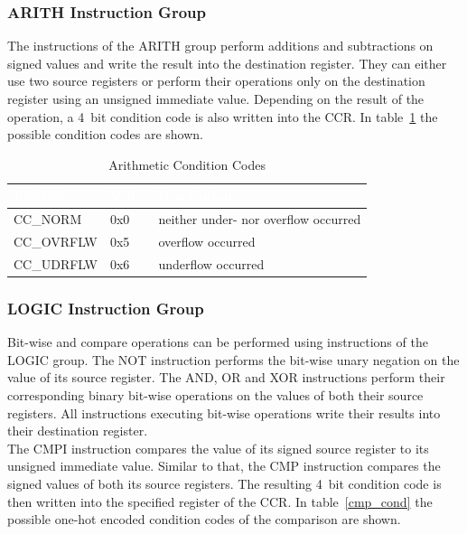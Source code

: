 \subsubsection{ARITH Instruction Group}

The instructions of the ARITH group perform additions and subtractions on signed values and write the result into the destination register.
They can either use two source registers or perform their operations only on the destination register using an unsigned immediate value.
Depending on the result of the operation, a 4~bit condition code is also written into the CCR.
In table~\ref{arith_cond} the possible condition codes are shown.

\begin{table}[htb]
\centering
\begin{tabular}{|l| l| l|}
    \hline
    \rowcolor{black!70}
    \textcolor{white}{\textbf{Identifier}} & \textcolor{white}{\textbf{Value}} & \textcolor{white}{\textbf{Description}} \\
    \hline
    CC\_NORM   & 0x0 & neither under- nor overflow occurred \\
    \hline
    \rowcolor{black!10}
    CC\_OVRFLW & 0x5 & overflow occurred \\
    \hline
    CC\_UDRFLW & 0x6 & underflow occurred \\
    \hline
\end{tabular}
\caption{Arithmetic Condition Codes} \label{arith_cond}
\end{table}

\subsubsection{LOGIC Instruction Group}

Bit-wise and compare operations can be performed using instructions of the LOGIC group.
The NOT instruction performs the bit-wise unary negation on the value of its source register.
The AND, OR and XOR instructions perform their corresponding binary bit-wise operations on the values of both their source registers.
All instructions executing bit-wise operations write their results into their destination register.\\
The CMPI instruction compares the value of its signed source register to its unsigned immediate value.
Similar to that, the CMP instruction compares the signed values of both its source registers.
The resulting 4~bit condition code is then written into the specified register of the CCR.
In table~\ref{cmp_cond} the possible one-hot encoded condition codes of the comparison are shown.

